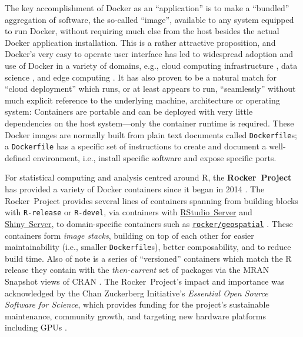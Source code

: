 The key accomplishment of Docker as an ``application'' is to make a
``bundled'' aggregation of software, the so-called ``image'', available
to any system equipped to run Docker, without requiring much else from
the host besides the actual Docker application installation. This is a
rather attractive proposition, and Docker's very easy to operate user
interface has led to widespread adoption and use of Docker in a variety
of domains, e.g., cloud computing infrastructure
\citep[e.g.,][]{Bernstein2014}, data science
\citep[e.g.,][]{boettiger_introduction_2015}, and edge computing
\citep[e.g.,][]{alam_orchestration_2018}. It has also proven to be a
natural match for ``cloud deployment'' which runs, or at least appears
to run, ``seamlessly'' without much explicit reference to the underlying
machine, architecture or operating system: Containers are portable and
can be deployed with very little dependencies on the host system---only
the container runtime is required. These Docker images are normally
built from plain text documents called \texttt{Dockerfile}s; a
\texttt{Dockerfile} has a specific set of instructions to create and
document a well-defined environment, i.e., install specific software and
expose specific ports.

For statistical computing and analysis centred around R, the
\textbf{Rocker~Project} has provided a variety of Docker containers
since it began in 2014 \citep{RJ-2017-065}. The Rocker~Project provides
several lines of containers spanning from building blocks with
\texttt{R-release} or \texttt{R-devel}, via containers with
\href{https://rstudio.com/products/rstudio/}{RStudio~Server} and
\href{https://rstudio.com/products/shiny/shiny-server/}{Shiny~Server},
to domain-specific containers such as
\href{https://github.com/rocker-org/geospatial}{\texttt{rocker/geospatial}}
\citep{rocker_geospatial_2019}. These containers form \emph{image
stacks}, building on top of each other for easier maintainability (i.e.,
smaller \texttt{Dockerfile}s), better composability, and to reduce build
time. Also of note is a series of ``versioned'' containers which match
the R release they contain with the \emph{then-current} set of packages
via the MRAN Snapshot views of CRAN \citep{microsoft_cran_2019}. The
Rocker~Project's impact and importance was acknowledged by the Chan
Zuckerberg Initiative's \emph{Essential Open Source Software for
Science}, which provides funding for the project's sustainable
maintenance, community growth, and targeting new hardware platforms
including GPUs \citep{chan_zuckerberg_initiative_maintaining_2019}.

